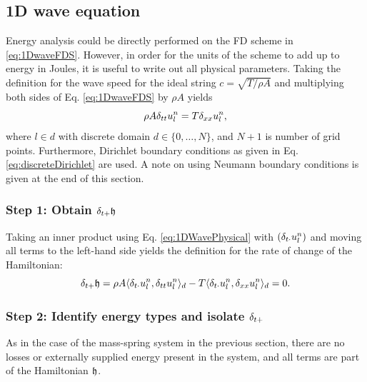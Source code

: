 {{{{\subsection{1D wave equation}\label{sec:1DWaveEnergyAnalysis}
Energy analysis could be directly performed on the FD scheme in \eqref{eq:1DwaveFDS}. However, in order for the units of the scheme to add up to energy in Joules, it is useful to write out all physical parameters. Taking the definition for the wave speed for the ideal string $c = \sqrt{T/\rho A}$ and multiplying both sides of Eq. \eqref{eq:1DwaveFDS} by $\rho A$ yields
\begin{equation}\label{eq:1DWavePhysical}
    \rho A \delta_{tt} u_l^n = T \delta_{xx} u_l^n,
\end{equation}
where $l\in d$ with discrete domain $d\in\{0, \hdots, N\}$, and $N+1$ is number of grid points. Furthermore, Dirichlet boundary conditions as given in Eq. \eqref{eq:discreteDirichlet} are used. A note on using Neumann boundary conditions is given at the end of this section.

\subsubsection{Step 1: Obtain $\delta_{t+} \mathfrak{h}$}
Taking an inner product using Eq. \eqref{eq:1DWavePhysical} with $\left( \delta_{t\cdot} u_l^n \right)$ and moving all terms to the left-hand side yields the definition for the rate of change of the Hamiltonian:
\begin{equation}\label{eq:rOC1DWave}
    \delta_{t+} \mathfrak{h} = \rho A \langle \delta_{t\cdot} u_l^n, \delta_{tt} u_l^n \rangle_d - T \langle \delta_{t\cdot}u_l^n, \delta_{xx} u_l^n\rangle_d = 0.
\end{equation}


\subsubsection{Step 2: Identify energy types and isolate $\delta_{t+}$}
As in the case of the mass-spring system in the previous section, there are no losses or externally supplied energy present in the system, and all terms are part of the Hamiltonian $\mathfrak{h}$.

}}}}
